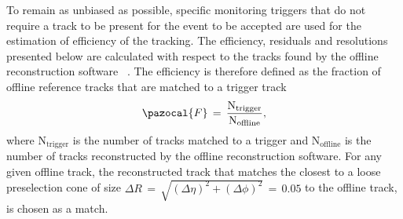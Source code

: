 	To remain as unbiased as possible, specific monitoring triggers that do not require a track to be present for the event to be accepted are used for the estimation of efficiency of the tracking. 
	The efficiency, residuals and resolutions presented below are calculated with respect to the tracks found by the offline reconstruction software ~\cite{Cornelissen_2008}. The efficiency is therefore defined as the fraction of offline reference tracks that are matched to a trigger track
	\begin{equation}
	\pazocal{F}\,=\,\frac{\mathrm{N_{trigger}}}{\mathrm{N_{offline}}},
	\end{equation}
	where $\mathrm{N_{trigger}}$ is the number of tracks matched to a trigger and $\mathrm{N_{offline}}$ is the number of tracks reconstructed by the offline reconstruction software.
	For any given offline track, the reconstructed track that matches the closest to a loose preselection cone of size $\Delta R\,=\,\sqrt{(\Delta\eta)^2+(\Delta\phi)^2}\,=\,0.05$ to the offline track, is chosen as a match. 
